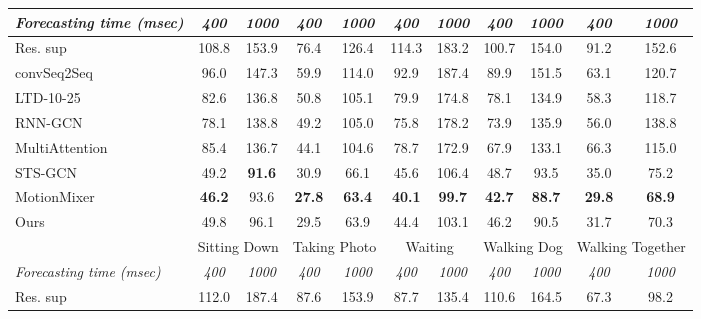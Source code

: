 \begin{table}
{\begin{tabular}{|l|cc|cc|cc|cc|cc|}
        \textit{Forecasting time (msec)}  & \textit{400} & \textit{1000} &  \textit{400} & \textit{1000}  &  \textit{400} & \textit{1000}  &   \textit{400} & \textit{1000}   & \textit{ 400} & \textit{1000} \\
        \midrule
            Res. sup~\cite{martinez2017} & 108.8 & 153.9 & 76.4 & 126.4 & 114.3 & 183.2 & 100.7 & 154.0 & 91.2 & 152.6 \\

            convSeq2Seq~\cite{Li_2018} & 96.0 & 147.3 & 59.9 & 114.0 & 92.9 & 187.4 & 89.9 & 151.5 & 63.1 & 120.7 \\

            LTD-10-25~\cite{Mao2019} & 82.6 & 136.8 & 50.8 & 105.1 & 79.9 & 174.8 & 78.1 & 134.9 & 58.3 & 118.7 \\

            RNN-GCN~\cite{Mao2020} & 78.1 & 138.8 & 49.2 & 105.0 & 75.8 & 178.2 & 73.9 & 135.9 & 56.0 & 138.8 \\

            MultiAttention~\cite{mao2021multi} & 85.4 & 136.7 &	44.1 & 104.6 & 78.7 & 172.9 & 67.9 & 133.1 & 66.3 & 115.0 \\
        
            STS-GCN~\cite{Sofianos2021}  & 49.2 & \textbf{91.6} &  30.9 & 66.1 & 45.6 & 106.4  & 48.7 & 93.5 &  35.0 & 75.2 \\

            MotionMixer~\cite{motionmixer2022}  & \textbf{46.2} & 93.6 & \textbf{27.8} & \textbf{63.4}  & \textbf{40.1} & \textbf{99.7}  & \textbf{42.7} & \textbf{88.7}  & \textbf{29.8} & \textbf{68.9 }\\
            \hline
            Ours & 49.8 & 96.1 & 29.5 & 63.9 & 44.4 & 103.1 & 46.2 & 90.5 & 31.7 & 70.3 \\
        \midrule

        & \multicolumn{2}{c|}{Sitting Down} &  \multicolumn{2}{c|}{Taking Photo}  &  \multicolumn{2}{c|}{Waiting} &  \multicolumn{2}{c|}{Walking Dog} &  \multicolumn{2}{c|}{Walking Together} \\
             
           \textit{Forecasting time (msec)}  & \textit{400} & \textit{1000} &  \textit{400} & \textit{1000}  &  \textit{400} & \textit{1000}  &   \textit{400} & \textit{1000}   & \textit{ 400} & \textit{1000} \\
        \midrule
            Res. sup~\cite{martinez2017} & 112.0 & 187.4 & 87.6 & 153.9 & 87.7 & 135.4 & 110.6 & 164.5 & 67.3 & 98.2 \\


\end{tabular}}
\end{table}
